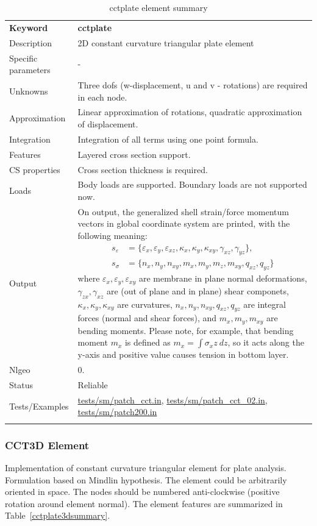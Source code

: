 \documentclass[a4paper]{article}
\newcommand{\param}[1]{\texttt{#1}} %
\newcommand{\templabel}{}%
\newcommand{\tempcaption}{}%
\newcounter{nelpar}
\newenvironment{elementsummary}[5]{%
  \gdef\tempcaption{#4}%
  \gdef\templabel{#5}%
  \setcounter{nelpar}{0}%
  \begin{center} %
    \begin{table}[!htb] %
      \begin{tabular}{|l|p{9cm}|}\hline %
        {\bf Keyword} & \bf{#1}\\ %
        {Description} & {#2}\\ %
        {Specific parameters} & {#3}\\ \hline %
}{
  \\ \hline %
      \end{tabular}%
      \caption{\tempcaption}%
      \label{\templabel}%
    \end{table}%
  \end{center}%
}
\newcommand{\elementParam}[1]{%
  \ifthenelse{\value{nelpar}>0} %
             {&{#1}}%
             {\setcounter{nelpar}{1}Parameters&{#1}}%
             \\%
}
\newcommand{\elementDescription}[2]{{#1} & {#2}\\}
\begin{document}
\begin{elementsummary}{cctplate}{2D constant curvature triangular plate element}{-}{cctplate element summary}{cctplatesummary}
\elementDescription{Unknowns}{Three dofs (w-displacement, u and v - rotations) are required in each node.}
\elementDescription{Approximation}{Linear approximation of rotations, quadratic approximation of displacement.}
\elementDescription{Integration}{Integration of all terms using one point formula.}
\elementDescription{Features}{Layered cross section support.}
\elementDescription{CS properties}{Cross section thickness is required.}
\elementDescription{Loads}{Body loads are supported. Boundary loads are not supported now.}
\elementDescription{Output}{On output, the generalized shell strain/force momentum vectors in global coordinate system are printed, with the following meaning:
\begin{align*}
s_{\varepsilon} &=\{\varepsilon_x, \varepsilon_y, \varepsilon_{xz}, \kappa_x, \kappa_y, \kappa_{xy}, \gamma_{xz}, \gamma_{yz}\},\\
s_{\sigma} &=\{n_x, n_y, n_{xy}, m_x, m_y, m_z, m_{xy}, q_{xz}, q_{yz}\}
\end{align*}
where $\varepsilon_x, \varepsilon_y, \varepsilon_{xy}$ are membrane in plane normal deformations, $\gamma_{zx}, \gamma_{xz}$ are (out of plane and in plane) shear componets, $\kappa_x, \kappa_y, \kappa_{xy}$ are curvatures, $n_x, n_y, n_{xy}, q_{xz}, q_{yz}$ are integral forces (normal and shear forces), and $m_x, m_y, m_{xy}$ are bending moments. 
Please note, for example, that bending moment $m_x$ is defined as $m_x=\int \sigma_x z\ dz$, so it acts along the y-axis and positive value causes tension in bottom layer.}
\elementDescription{Nlgeo}{0.}
\elementDescription{Status}{Reliable}
\elementDescription{Tests/Examples}{\href{https://github.com/oofem/oofem/blob/devel/tests/sm/patch\_cct.in}{tests/sm/patch\_cct.in}, \href{https://github.com/oofem/oofem/blob/devel/tests/sm/patch\_cct\_02.in}{tests/sm/patch\_cct\_02.in}, \href{https://github.com/oofem/oofem/blob/devel/tests/sm/patch200.in}{tests/sm/patch200.in}}
\end{elementsummary}


\subsubsection {CCT3D Element}
Implementation of constant curvature triangular element for plate
analysis. Formulation based on Mindlin hypothesis. The element could be arbitrarily oriented in space. 
The nodes should be numbered anti-clockwise (positive rotation around element normal). 
The element features are summarized in Table~\ref{cctplate3dsummary}.
\end{document}
